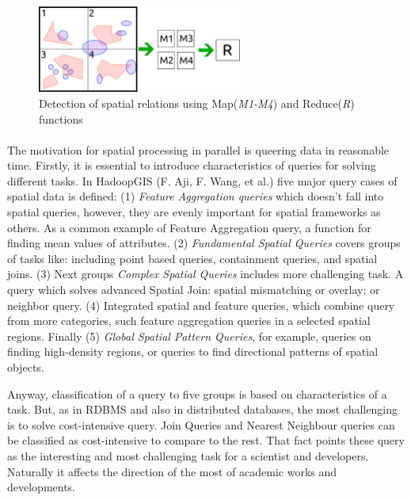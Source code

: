 \documentclass[a4paper,12pt,oneside]{report}
\begin{document}
	\begin{figure}[h!]
		\centering
		\includegraphics[width=0.6\textwidth]{./img/mapred_spatial.pdf}
		\caption[Spatial MapReduce]{\centering Detection of spatial relations using
			Map(\textit{M1-M4}) and Reduce(\textit{R}) functions}
		\label{fig:mapred_spatial}
	\end{figure}
	\paragraph{}
	
	The motivation for spatial processing in parallel is queering data in reasonable
	time. 
	Firstly, it is essential to introduce characteristics of queries for solving
	different 
	tasks. In HadoopGIS (F. Aji, F. Wang, et al.\cite{hadoopGIS})  five major 
	query cases of spatial data is defined: (1) \textit{Feature Aggregation queries}
	which doesn’t 
	fall into spatial queries, however, they are evenly important for spatial
	frameworks 
	as others. As a common example of Feature Aggregation query, a function for
	finding mean 
	values of attributes. 
	(2) \textit{Fundamental Spatial Queries} covers groups of tasks like: including
	point based 
	queries, containment queries, and spatial joins. (3) Next groups 
	\textit{ Complex Spatial Queries} includes more challenging task. A query which
	solves 
	advanced Spatial Join: spatial mismatching or overlay; or neighbor query. (4)
	Integrated 
	spatial and feature queries, which combine query from more categories, such
	feature 
	aggregation queries in a selected spatial regions. Finally (5) \textit{Global
		Spatial Pattern Queries}, for example, queries on finding high-density regions,
	or 
	queries to find directional patterns of spatial objects.
	
	Anyway, classification of a query to five groups is based on characteristics of
	a task. 
	But, as in RDBMS and also in distributed databases, the most challenging is to
	solve  cost-intensive query. 
	Join Queries and Nearest Neighbour queries can be classified as 
	cost-intensive to compare to the rest. That fact points these query as the
	interesting and
	most challenging task for a scientist and developers. Naturally it affects the
	direction of the most of academic works and developments.
	
\end{document}
